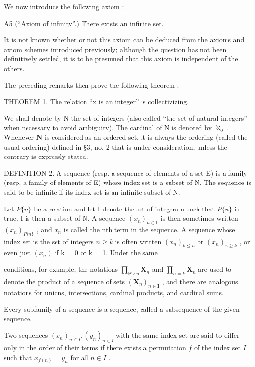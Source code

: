 We now introduce the following axiom :

A5 (``Axiom of infinity''.) There exists an infinite set.

It is not known whether or not this axiom can be deduced from the axioms and axiom schemes introduced previously; although the question has not been definitively settled, it is to be presumed that this axiom is independent of the others.

The preceding remarks then prove the following theorem :

THEOREM 1. The relation ``x is an integer'' is collectivizing.

We shall denote by N the set of integers (also called ``the set of natural integers'' when necessary to avoid ambiguity). The cardinal of N is denoted by \(\aleph_0\) . Whenever \(\mathbf{N}\) is considered as an ordered set, it is always the ordering (called the usual ordering) defined in §3, no. 2 that is under consideration, unless the contrary is expressly stated.

DEFINITION 2. A sequence (resp. a sequence of elements of a set E) is a family (resp. a family of elements of E) whose index set is a subset of N. The sequence is said to be infinite if its index set is an infinite subset of N.

Let \(P\{n\}\) be a relation and let I denote the set of integers n such that \(P\{n\}\) is true. I is then a subset of N. A sequence \((x_n)_{n \in \mathbf{I}}\) is then sometimes written \((x_n)_{P\{n\}}\) , and \(x_n\) is called the nth term in the sequence. A sequence whose index set is the set of integers \(n \geqslant k\) is often written \((x_n)_{k \leqslant n}\) or \((x_n)_{n \geqslant k}\) , or even just \((x_n)\) if k = 0 or k = 1. Under the same

conditions, for example, the notations \(\prod_{\mathbf{P}\nmid n}\mathbf{X}_n\) and \(\prod_{n = k}\mathbf{X}_n\) are used to denote the product of a sequence of sets \((\mathbf{X}_n)_{n\in \mathbf{I}}\) , and there are analogous notations for unions, intersections, cardinal products, and cardinal sums.

Every subfamily of a sequence is a sequence, called a subsequence of the given sequence.

Two sequences \((x_{n})_{n\in I}, (y_{n})_{n\in I}\) with the same index set are said to differ only in the order of their terms if there exists a permutation \(f\) of the index set \(I\) such that \(x_{f(n)} = y_{n}\) for all \(n\in I\) .


